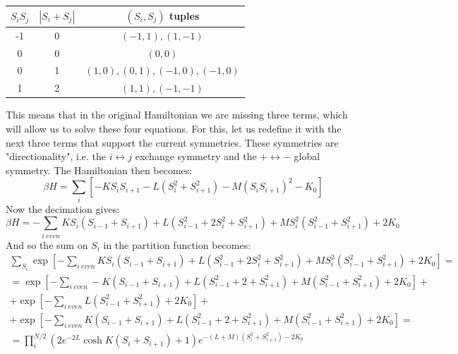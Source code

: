 \documentclass{article}
\begin{document}
\begin{center}
\begin{tabular}{|c|c|c|}
    \hline
    $S_i S_j$ & $\left|S_i + S_j\right|$ & $\left(S_i,S_j\right)$ tuples
    \\
    \hline
    -1 & 0 & $(-1, 1), (1, -1)$
    \\
    0 & 0 & $(0,0)$
    \\
    0 & 1 & $(1,0), (0,1), (-1,0), (-1,0)$
    \\
    1 & 2 & $(1,1), (-1,-1)$
    \\
    \hline
\end{tabular}
\end{center}
This means that in the original Hamiltonian we are missing three terms, which will allow us to solve these four equations. For this, let us redefine it with the next three terms that support the current symmetries. These symmetries are "directionality", i.e. the $i \leftrightarrow j$ exchange symmetry and the $+ \leftrightarrow -$ global symmetry. The Hamiltonian then becomes:
\begin{equation}
    \beta H = \sum_i \left[
        -K S_i S_{i+1}
        -L \left(S_i^2 + S_{i+1}^2\right)
        -M \left(S_i S_{i+1}\right)^2
        - K_0
    \right]
\end{equation}
Now the decimation gives:
\begin{equation}
    \beta H = -\sum_{i \ even}
        K S_i (S_{i-1} + S_{i+1})
        + L(S_{i-1}^2 + 2S_i^2 + S_{i+1}^2)
        + MS_i^2(S_{i-1}^2 + S_{i+1}^2)
        + 2K_0
\end{equation}
And so the sum on $S_i$ in the partition function becomes:
\begin{equation}
\begin{gathered}
    \sum_{S_i} \exp[-\sum_{i \ even}
        K S_i (S_{i-1} + S_{i+1})
        + L(S_{i-1}^2 + 2S_i^2 + S_{i+1}^2)
        + MS_i^2(S_{i-1}^2 + S_{i+1}^2)
        + 2K_0] = \\ =
    \exp[-\sum_{i \ even}
        -K (S_{i-1} + S_{i+1})
        + L(S_{i-1}^2 + 2 + S_{i+1}^2)
        + M(S_{i-1}^2 + S_{i+1}^2)
        + 2K_0] + \\ +
    \exp[-\sum_{i \ even}
        L(S_{i-1}^2 + S_{i+1}^2)
        + 2K_0] + \\ +
    \exp[-\sum_{i \ even}
        K (S_{i-1} + S_{i+1})
        + L(S_{i-1}^2 + 2 + S_{i+1}^2)
        + M(S_{i-1}^2 + S_{i+1}^2)
        + 2K_0] = \\ =
    \prod_{i}^{N/2}
        \left(
            2e^{-2L}\cosh K(S_i + S_{i+1}) + 1
        \right)
        e^{- (L + M)(S_i^2 + S_{i+1}^2) - 2K_0}
\end{gathered}
\end{equation}
\end{document}
